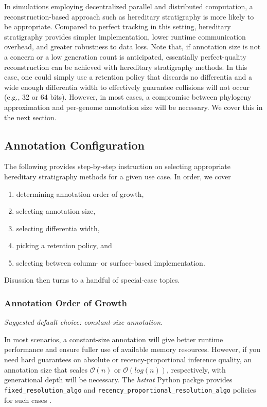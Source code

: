 In simulations employing decentralized parallel and distributed computation, a reconstruction-based approach such as hereditary stratigraphy is more likely to be appropriate.
Compared to perfect tracking in this setting, hereditary stratigraphy provides simpler implementation, lower runtime communication overhead, and greater robustness to data loss.
Note that, if annotation size is not a concern or a low generation count is anticipated, essentially perfect-quality reconstruction can be achieved with hereditary stratigraphy methods.
In this case, one could simply use a retention policy that discards no differentia and a wide enough differentia width to effectively guarantee collisions will not occur (e.g., 32 or 64 bits).
However, in most cases, a compromise between phylogeny approximation and per-genome annotation size will be necessary.
We cover this in the next section.

\subsection{Annotation Configuration}

The following provides step-by-step instruction on selecting appropriate hereditary stratigraphy methods for a given use case.
In order, we cover
\begin{enumerate}
\item determining annotation order of growth,
\item selecting annotation size,
\item selecting differentia width,
\item picking a retention policy, and
\item selecting between column- or surface-based implementation.
\end{enumerate}

Disussion then turns to a handful of special-case topics.

\subsubsection{Annotation Order of Growth}
\textit{Suggested default choice: constant-size annotation.}

In most scenarios, a constant-size annotation will give better runtime performance and ensure fuller use of available memory resources.
However, if you need hard guarantees on absolute or recency-proportional inference quality, an annotation size that scales $\mathcal{O}(n)$ or $\mathcal{O}(log(n))$, respectively, with generational depth will be necessary.
The \textit{hstrat} Python packge provides \texttt{fixed\_resolution\_algo} and  \texttt{recency\_proportional\_resolution\_algo} policies for such cases \citep{moreno2022hstrat}.


